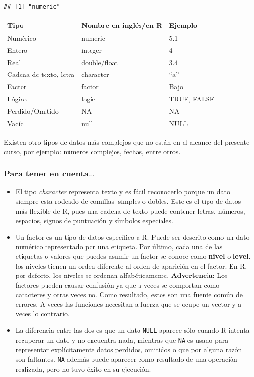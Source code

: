 \documentclass[
]{book}
\begin{document}
\begin{verbatim}
## [1] "numeric"
\end{verbatim}

\begin{longtable}[]{@{}lll@{}}
\toprule\noalign{}
Tipo & Nombre en inglés/en R & Ejemplo \\
\midrule\noalign{}
\endhead
\bottomrule\noalign{}
\endlastfoot
Numérico & numeric & 5.1 \\
Entero & integer & 4 \\
Real & double/float & 3.4 \\
Cadena de texto, letra & character & ``a'' \\
Factor & factor & Bajo \\
Lógico & logic & TRUE, FALSE \\
Perdido/Omitido & NA & NA \\
Vacío & null & NULL \\
\end{longtable}

Existen otro tipos de datos más complejos que no están en el alcance del presente curso, por ejemplo: números complejos, fechas, entre otros.

\subsubsection{Para tener en cuenta\ldots{}}\label{para-tener-en-cuenta}

\begin{itemize}
\item
  El tipo \emph{character} representa texto y es fácil reconocerlo porque un dato siempre esta rodeado de comillas, simples o dobles.
  Este es el tipo de datos más flexible de R, pues una cadena de texto puede contener letras, números, espacios, signos de puntuación y símbolos especiales.
\item
  Un factor es un tipo de datos específico a R.
  Puede ser descrito como un dato numérico representado por una etiqueta.
  Por último, cada una de las etiquetas o valores que puedes asumir un factor se conoce como \textbf{nivel} o \textbf{level}.
  los niveles tienen un orden diferente al orden de aparición en el factor.
  En R, por defecto, los niveles se ordenan alfabéticamente.
  \textbf{Advertencia}: Los factores pueden causar confusión ya que a veces se comportan como caracteres y otras veces no.
  Como resultado, estos son una fuente común de errores.
  A veces las funciones necesitan a fuerza que se ocupe un vector y a veces lo contrario.
\item
  La diferencia entre las dos es que un dato \texttt{NULL} aparece sólo cuando R intenta recuperar un dato y no encuentra nada, mientras que \texttt{NA} es usado para representar explícitamente datos perdidos, omitidos o que por alguna razón son faltantes.
  \texttt{NA} además puede aparecer como resultado de una operación realizada, pero no tuvo éxito en su ejecución.
\end{itemize}
\end{document}
